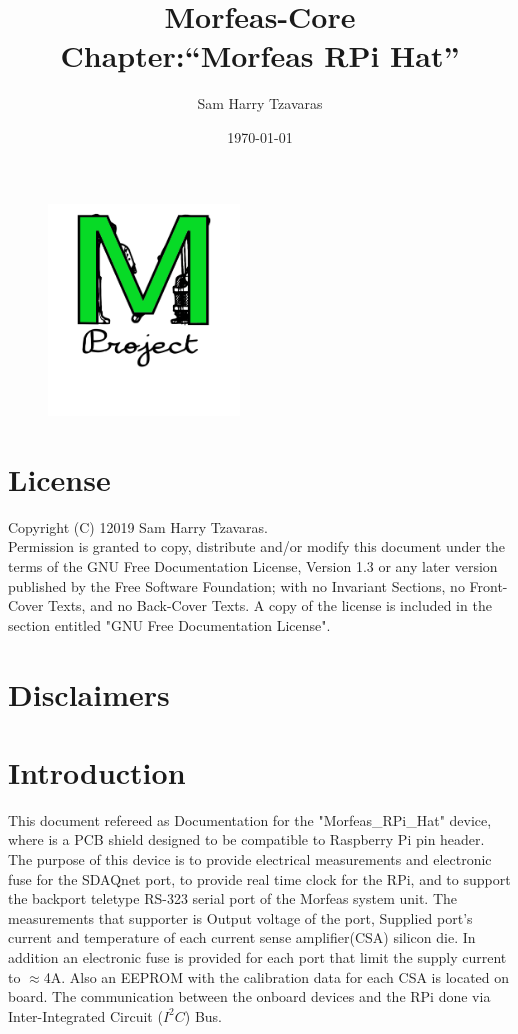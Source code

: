 \documentclass{article}
\title{Morfeas-Core\\Chapter:``Morfeas RPi Hat''}
\date{\today}
\author{Sam Harry Tzavaras}
\begin{document}
\clearpage
\begin{figure}
\centering
  \includegraphics[width=2in]{../../../Docs/Morfeas_project_Documentation/ArtWork/Morfeas_logo_green.png}
\end{figure}
\maketitle
\thispagestyle{empty}
\newpage
\section{License}
Copyright (C)  12019  Sam Harry Tzavaras.\\
Permission is granted to copy, distribute and/or modify this document
under the terms of the GNU Free Documentation License, Version 1.3
or any later version published by the Free Software Foundation;
with no Invariant Sections, no Front-Cover Texts, and no Back-Cover Texts.
A copy of the license is included in the section entitled "GNU Free Documentation License".
\section{Disclaimers}
\newpage
\newpage
\tableofcontents
\newpage
\section{Introduction}
This document refereed as Documentation for the "Morfeas\_RPi\_Hat" device, where is a PCB shield designed to be compatible to Raspberry Pi pin header.
The purpose of this device is to provide electrical measurements and electronic fuse for the SDAQnet port, to provide real time clock for the RPi,
and to support the backport teletype RS-323 serial port of the Morfeas system unit. The measurements that supporter is Output voltage of the port,
Supplied port's current and temperature of each current sense amplifier(CSA) silicon die.
In addition an electronic fuse is provided for each port that limit the supply current to $\approx$4A.
Also an EEPROM with the calibration data for each CSA is located on board. The communication between the onboard devices and the RPi done
via Inter-Integrated Circuit ($I^2C$) Bus.
\end{document}
